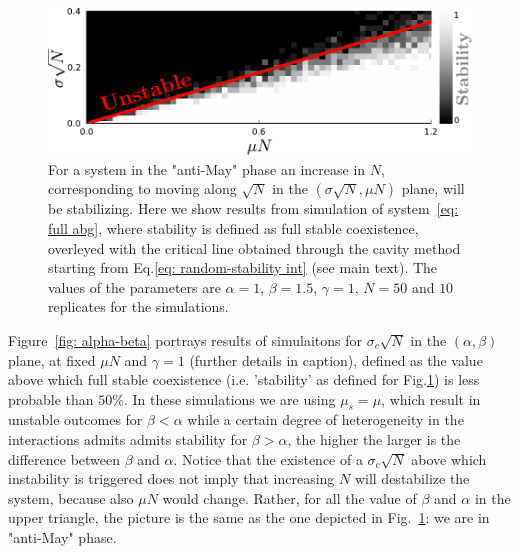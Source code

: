 \documentclass[
 reprint,
 amsmath,amssymb,
 aps,
]{revtex4-2}
\begin{document}
\begin{figure}[h!]
    \centering
    \includegraphics[width=.45\textwidth]{figs/beta1_5-S50-N10-diversity.pdf}
    \caption{For a system in the "anti-May" phase an increase in $N$,
    corresponding to moving along $\sqrt{N}$ in the $(\sigma \sqrt{N},\mu N)$ plane,
    will be stabilizing. Here we show results from simulation of system~\eqref{eq: full abg},
    where stability is defined as full stable coexistence, overleyed with the critical line
    obtained through the cavity method starting from Eq.\eqref{eq: random-stability int} 
    (see main text). The values of the parameters are $\alpha=1$, $\beta=1.5$,
    $\gamma=1$, $N=50$ and $10$ replicates for the simulations.}
    \label{fig: stability line + sims}
\end{figure}

Figure~\ref{fig: alpha-beta} portrays results of simulaitons 
for $\sigma_c\sqrt{N}$ in the $(\alpha,\beta)$ plane, 
at fixed $\mu N$ and $\gamma = 1$ (further details in caption), 
defined as the value above which
full stable coexistence (i.e. 'stability'
as defined for Fig.\ref{fig: stability line + sims}) 
is less probable than $50\%$.
In these simulations we are using $\mu_s = \mu$, which result
in unstable outcomes for $\beta<\alpha$ while
a certain degree of heterogeneity in the interactions
admits admits stability for $\beta>\alpha$, the higher
the larger is the difference between $\beta$ and $\alpha$.
Notice that the existence of a $\sigma_c\sqrt{N}$ above which
instability is triggered does not imply that increasing $N$ will
destabilize the system, because also $\mu N$ would change.
Rather, for all the value of $\beta$ and $\alpha$ in the
upper triangle, the picture is the same as the one depicted in 
Fig.~\ref{fig: stability line + sims}: we are in "anti-May"
phase.
\end{document}
